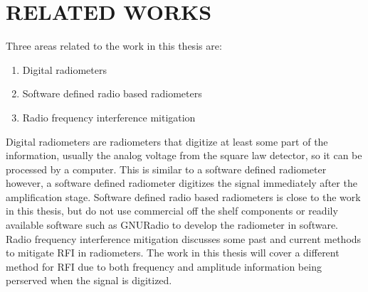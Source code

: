 

\chapter{RELATED WORKS}\label{ch:relatedworks}

Three areas  related to the work in this thesis are:

\begin{enumerate}
\item Digital radiometers
\item Software defined radio based radiometers
\item Radio frequency interference mitigation
\end{enumerate} 

Digital radiometers are radiometers that digitize at least some part of the information, usually the analog voltage from the square law detector, so it can be processed by a computer.  This is similar to a software defined radiometer however, a software defined radiometer digitizes the signal immediately after the amplification stage.  Software defined radio based radiometers is close to the work in this thesis, but do not use commercial off the shelf components or readily available software such as GNURadio to develop the radiometer in software.  Radio frequency interference mitigation discusses some past and current methods to mitigate RFI in radiometers.  The work in this thesis will cover a different method for RFI due to both frequency and amplitude information being perserved when the signal is digitized.


